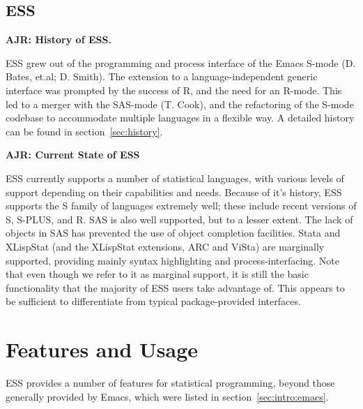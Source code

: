 \documentclass{article}
\begin{document}
\subsection{ESS}
\label{sec:intro:ESS}

\textbf{AJR: History of ESS.}

ESS grew out of the programming and process interface of the Emacs
S-mode (D. Bates, et.al; D. Smith).  The extension to a
language-independent generic interface was prompted by the success of
R, and the need for an R-mode.  This led to a merger with the SAS-mode
(T. Cook), and the refactoring of the S-mode codebase to accommodate
multiple languages in a flexible way.  A detailed  history can be
found in section~\ref{sec:history}.

\textbf{AJR: Current State of ESS}

ESS currently supports a number of statistical languages, with various
levels of support depending on their capabilities and needs.  Because
of it's history, ESS supports the S family of languages extremely
well; these include recent versions of S, S-PLUS, and R.  SAS is also
well supported, but to a lesser extent.  The lack of objects in SAS
has prevented the use of object completion facilities.  Stata and
XLispStat (and the XLispStat extensions, ARC and ViSta) are marginally
supported, providing mainly syntax highlighting and
process-interfacing.  Note that even though we refer to it as marginal
support, it is still the basic functionality that the majority of ESS
users take advantage of.  This appears to be sufficient to
differentiate from typical package-provided interfaces.

\section{Features and Usage}
\label{sec:basic}

ESS provides a number of features for statistical programming, beyond
those generally provided by Emacs, which were listed in
section~\ref{sec:intro:emacs}.
\end{document}
